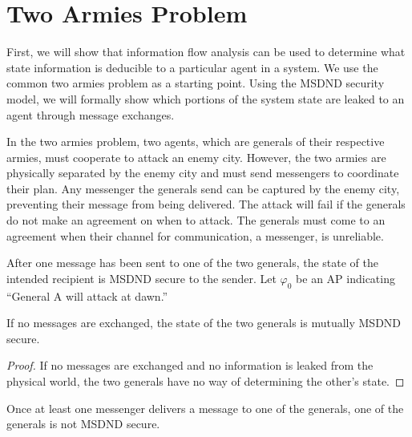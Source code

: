 \section{Two Armies Problem}

First, we will show that information flow analysis can be used to determine what state information is deducible to a particular agent in a system.
We use the common two armies problem as a starting point.
Using the MSDND security model, we will formally show which portions of the system state are leaked to an agent through message exchanges.

In the two armies problem, two agents, which are generals of their respective armies, must cooperate to attack an enemy city.
However, the two armies are physically separated by the enemy city and must send messengers to coordinate their plan.
Any messenger the generals send can be captured by the enemy city, preventing their message from being delivered.
The attack will fail if the generals do not make an agreement on when to attack.
The generals must come to an agreement when their channel for communication, a messenger, is unreliable.

After one message has been sent to one of the two generals, the state of the intended recipient is MSDND secure to the sender.
Let $\varphi_0$ be an \ac{AP} indicating ``General A will attack at dawn.''

\begin{thm}
If no messages are exchanged, the state of the two generals is mutually MSDND secure. \label{thm:nomsg}
\end{thm}

\begin{proof}
If no messages are exchanged and no information is leaked from the physical world, the two generals have no way of determining the other's state.
\end{proof}

\begin{thm}
Once at least one messenger delivers a message to one of the generals, one of the generals is not MSDND secure.
\end{thm}

